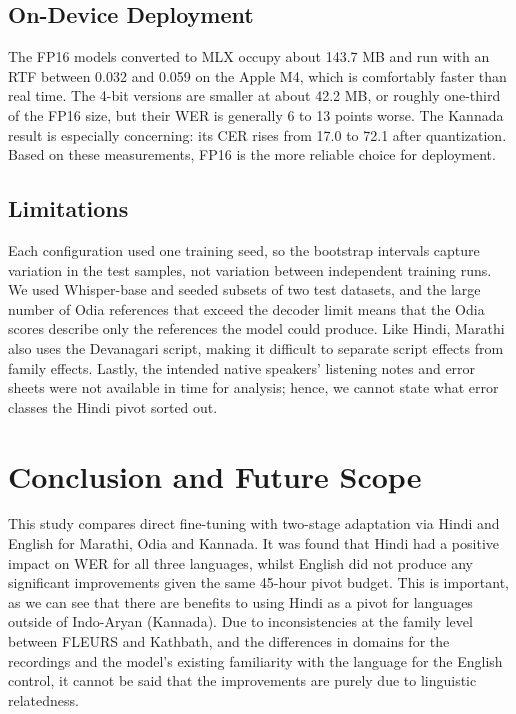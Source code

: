 \documentclass[conference]{IEEEtran}
\begin{document}
\subsection{On-Device Deployment}

The FP16 models converted to MLX occupy about 143.7 MB and run with an
RTF between 0.032 and 0.059 on the Apple M4, which is comfortably faster
than real time. The 4-bit versions are smaller at about
42.2 MB, or roughly one-third of the FP16 size, but their WER is generally
6 to 13 points worse. The Kannada result is especially concerning:
its CER rises from 17.0 to 72.1 after quantization. Based on these
measurements, FP16 is the more reliable choice for deployment.



\subsection{Limitations}

Each configuration used one training seed, so the bootstrap intervals capture variation in the test samples, not variation between independent training runs. We used Whisper-base and seeded subsets of two test datasets, and the large number of Odia references that exceed the decoder limit means that the Odia scores describe only the references the model could produce. Like Hindi, Marathi also uses the Devanagari script, making it difficult to separate script effects from family effects. Lastly, the intended native speakers' listening notes and error sheets were not available in time for analysis; hence, we cannot state what error classes the Hindi pivot sorted out.

\section{Conclusion and Future Scope}

This study compares direct fine-tuning with two-stage adaptation via Hindi and English for Marathi, Odia and Kannada. It was found that Hindi had a positive impact on WER for all three languages, whilst English did not produce any significant improvements given the same 45-hour pivot budget. This is important, as we can see that there are benefits to using Hindi as a pivot for languages outside of Indo-Aryan (Kannada). Due to inconsistencies at the family level between FLEURS and Kathbath, and the differences in domains for the recordings and the model's existing familiarity with the language for the English control, it cannot be said that the improvements are purely due to linguistic relatedness.
\end{document}

